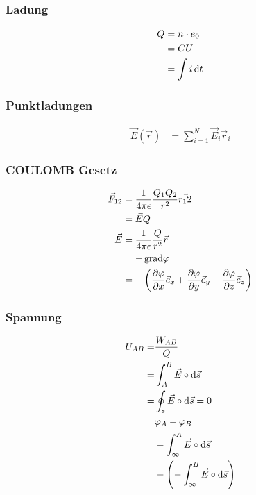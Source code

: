 \begin{multicols}{2}{}
\subsubsection{Ladung}
\begin{align*}
Q&=n\cdot e_0\\
&=CU\\
&=\int i \mathop{}\!\mathrm{d} t
\end{align*}

\subsubsection{Punktladungen}
\begin{align*}
\vec{E}(\vec{r})&=\sum_{i=1}^{N}\vec{E}_i{\vec{r}_i}
\end{align*}
\vspace{15mm}
\end{multicols}

\begin{multicols}{2}{}
\subsubsection{COULOMB Gesetz}
\begin{align*}
\vec{F}_{12}&=\frac{1}{4\pi\epsilon}\frac{Q_1Q_2}{r^2}\vec{r_12}\\
&=\vec{E}Q\\
\vec{E}&=\frac{1}{4\pi\epsilon}\frac{Q}{r^2}\vec{r}\\
&=-\mathop{}\!\mathrm{grad}\varphi\\
&=-\left(\frac{\partial \varphi}{\partial x}\vec{e}_x+\frac{\partial \varphi}{\partial y}\vec{e}_y+\frac{\partial \varphi}{\partial z}\vec{e}_z\right)
\end{align*}
\vspace{15mm}

\subsubsection{Spannung}
\begin{align*}
U_{AB}=&\frac{W_{AB}}{Q}\\
=&\int_A^B\vec{E}\circ\mathop{}\!\mathrm{d}\vec{s}\\
=&\oint_s\vec{E}\circ\mathop{}\!\mathrm{d}\vec{s}=0\\
=&\varphi_A-\varphi_B\\
=&-\int_\infty^A\vec{E}\circ\mathop{}\!\mathrm{d}\vec{s}\\
&-\left(-\int_\infty^B\vec{E}\circ\mathop{}\!\mathrm{d}\vec{s}\right)
\end{align*}
\end{multicols}

